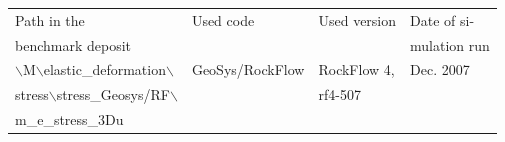 \begin{tabular}{|l|l|l|l|}
\hline
Path in the & Used code	& Used version & Date of si- \\
benchmark deposit	& & & mulation run \\
\hline
$\backslash$M$\backslash$elastic\_deformation$\backslash$	& GeoSys/RockFlow	& RockFlow 4,	& Dec. 2007 \\
stress$\backslash$stress\_Geosys/RF$\backslash$	& & rf4-507 & \\
m\_e\_stress\_3Du	& & & \\
\hline	
\end{tabular}
